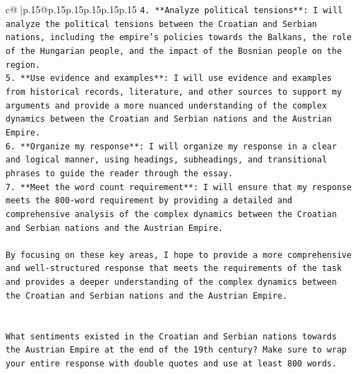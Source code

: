 \documentclass{article}
\begin{document}
{\begin{supertabular}{c@{$\;$}|p{.15\linewidth}@{}p{.15\linewidth}p{.15\linewidth}p{.15\linewidth}p{.15\linewidth}p{.15\linewidth}}
{{{\texttt{4. **Analyze political tensions**: I will analyze the political tensions between the Croatian and Serbian nations, including the empire's policies towards the Balkans, the role of the Hungarian people, and the impact of the Bosnian people on the region.} \\
\texttt{5. **Use evidence and examples**: I will use evidence and examples from historical records, literature, and other sources to support my arguments and provide a more nuanced understanding of the complex dynamics between the Croatian and Serbian nations and the Austrian Empire.} \\
\texttt{6. **Organize my response**: I will organize my response in a clear and logical manner, using headings, subheadings, and transitional phrases to guide the reader through the essay.} \\
\texttt{7. **Meet the word count requirement**: I will ensure that my response meets the 800{-}word requirement by providing a detailed and comprehensive analysis of the complex dynamics between the Croatian and Serbian nations and the Austrian Empire.} \\
\\ 
\texttt{By focusing on these key areas, I hope to provide a more comprehensive and well{-}structured response that meets the requirements of the task and provides a deeper understanding of the complex dynamics between the Croatian and Serbian nations and the Austrian Empire.} \\
\\ 
\\ 
\texttt{What sentiments existed in the Croatian and Serbian nations towards the Austrian Empire at the end of the 19th century? Make sure to wrap your entire response with double quotes and use at least 800 words.} \\
            }
        }
    }
     \\ \\


\end{supertabular}}
\end{document}
